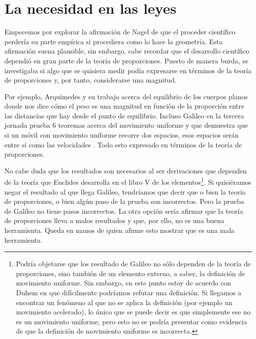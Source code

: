 \section{La necesidad en las leyes}

\noindent Empecemos por explorar la afirmación de Nagel de que el proceder científico perdería su parte empírica si procediera como lo hace la geometría. Esta afirmación suena plausible, sin embargo, cabe recordar que el desarrollo científico dependió en gran parte de la teoría de proporciones. Puesto de manera burda, se investigaba si algo que se quisiera medir podía expresarse en términos de la teoría de proporciones y, por tanto, considerarse una magnitud.

Por ejemplo, Arquímedes y su trabajo acerca del equilibrio de los cuerpos planos donde nos dice cómo el peso es una magnitud en función de la proporción entre las distancias que hay desde el punto de equilibrio. Incluso Galileo en la tercera jornada prueba 6 teoremas acerca del movimiento uniforme y que demuestra que si un móvil con movimiento uniforme recorre dos espacios, esos espacios serán entre sí como las velocidades \cite[p. 215]{galtre}. Todo esto expresado en términos de la teoría de proporciones.

No cabe duda que los resultados son necesarios al ser derivaciones que dependen de la teoría que Euclides desarrolla en el libro V de los elementos\footnote{Podría objetarse que los resultado de Galileo no sólo dependen de la teoría de proporciones, sino también de un elemento externo, a saber, la definición de movimiento uniforme. Sin embargo, en este punto estoy de acuerdo con Duhem \cite{Duhem1976} en que difícilmente podríamos refutar una definición. Si llegamos a encontrar un fenómeno al que no se aplica la definición (por ejemplo un movimiento acelerado), lo único que se puede decir es que simplemente ese no es un movimiento uniforme, pero esto no se podría presentar como evidencia de que la definición de movimiento uniforme es incorrecta.}. Si quisiéramos negar el resultado al que llega Galileo, tendríamos que decir que o bien la teoría de proporciones, o bien algún paso de la prueba son incorrectos. Pero la prueba de Galileo no tiene pasos incorrectos. La otra opción sería afirmar que la teoría de proporciones lleva a malos resultados y que, por ello, no es una buena herramienta. Queda en manos de quien afirme esto mostrar que es una mala herramienta.

